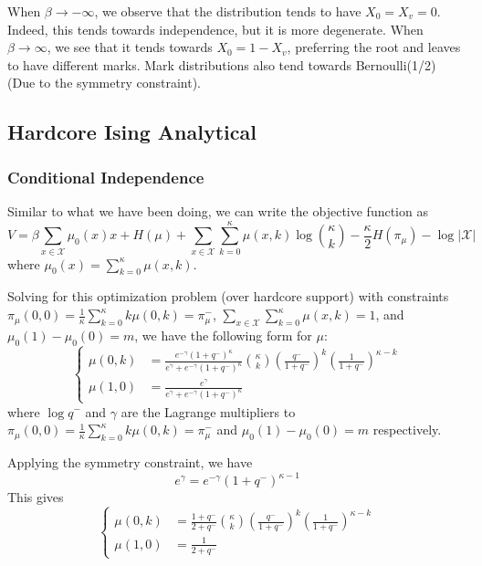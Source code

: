 \documentclass[12pt]{article}
\numberwithin{equation}{section}
\begin{document}
When $\beta\rightarrow-\infty$, we observe that the distribution tends to have $X_0=X_v=0$. Indeed, this tends towards independence, but it is more
degenerate. When $\beta\rightarrow\infty$, we see that it tends towards $X_0=1-X_v$, preferring the root and leaves to have different marks.
Mark distributions also tend towards Bernoulli(1/2) (Due to the symmetry constraint).

\newpage

\subsection{Hardcore Ising Analytical}

\subsubsection{Conditional Independence}

Similar to what we have been doing, we can write the objective function as
\begin{equation*}
    V = \beta\sum_{x\in\mathcal{X}} \mu_0(x) x + H(\mu) + \sum_{x\in\mathcal{X}}\sum_{k=0}^\kappa \mu(x, k)\log{\kappa\choose k} - \frac\kappa2 H(\pi_\mu) - \log|\mathcal{X}|
\end{equation*}
where $\mu_0(x) = \sum_{k=0}^\kappa\mu(x, k)$.

Solving for this optimization problem (over hardcore support) with constraints
$\pi_\mu(0, 0) = \frac1\kappa\sum_{k=0}^\kappa k\mu(0, k) = \pi_\mu^-$, $\sum_{x\in\mathcal{X}}\sum_{k=0}^\kappa \mu(x, k)=1$, and $\mu_0(1) - \mu_0(0) = m$, we have the following form for $\mu$:
\begin{equation}
    \begin{cases}
        \mu(0, k) & = \displaystyle\frac{e^{-\gamma}(1+q^-)^\kappa}{e^\gamma + e^{-\gamma}(1+q^-)^\kappa}{\kappa\choose k}\left(\frac{q^-}{1+q^-}\right)^k\left(\frac{1}{1+q^-}\right)^{\kappa-k} \\
        \mu(1, 0) & = \displaystyle\frac{e^{\gamma}}{e^\gamma + e^{-\gamma}(1+q^-)^\kappa}
    \end{cases}
\end{equation}
where $\log q^-$ and $\gamma$ are the Lagrange multipliers to $\pi_\mu(0, 0) = \frac1\kappa\sum_{k=0}^\kappa k\mu(0, k) = \pi_\mu^-$ and $\mu_0(1) - \mu_0(0) = m$ respectively.

Applying the symmetry constraint, we have
\begin{equation}
    e^\gamma = e^{-\gamma}(1+q^-)^{\kappa-1}
\end{equation}
This gives
\begin{equation}
    \begin{cases}
        \mu(0, k) & = \displaystyle\frac{1+q^-}{2+q^-}{\kappa\choose k}\left(\frac{q^-}{1+q^-}\right)^k\left(\frac{1}{1+q^-}\right)^{\kappa-k} \\
        \mu(1, 0) & = \displaystyle\frac{1}{2+q^-}
    \end{cases}
    \label{Eq.HAIS-Q-SOL}
\end{equation}
\end{document}
